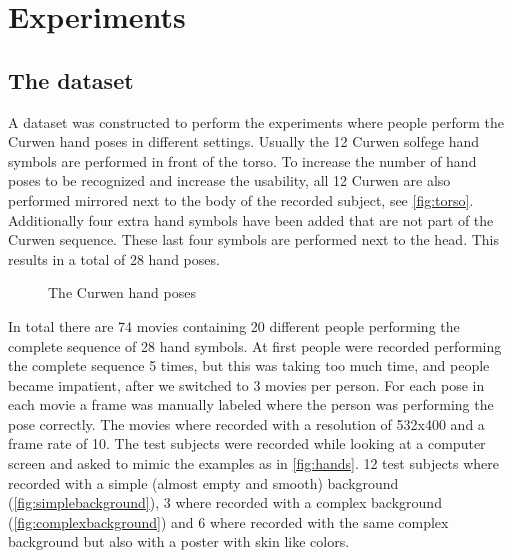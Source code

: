
\chapter{Experiments}
\label{ch:experiments}


\section{The dataset}
A dataset was constructed to perform the experiments where people perform the Curwen hand poses in different settings. Usually the 12 Curwen solfege hand symbols are performed in front of the torso. To increase the number of hand poses to be recognized and increase the usability, all 12 Curwen are also performed mirrored next to the body of the recorded subject, see \autoref{fig:torso}. Additionally four extra hand symbols have been added that are not part of the Curwen sequence. These last four symbols are performed next to the head. This results in a total of 28 hand poses.

\begin{figure}[htbp]
  \centering
\hspace{0.03\linewidth}
  \caption{The Curwen hand poses}
  \label{fig:torso}
\end{figure}


In total there are 74 movies containing 20 different people performing the complete sequence of 28 hand symbols. At first people were recorded performing the complete sequence 5 times, but this was taking too much time, and people became impatient, after we switched to 3 movies per person. For each pose in each movie a frame was manually labeled where the person was performing the pose correctly.  The movies where recorded with  a resolution of 532x400 and a frame rate of 10. The test subjects were recorded while looking at a computer screen and asked to mimic the examples as in \autoref{fig:hands}. 12 test subjects where recorded with a simple (almost empty and smooth) background (\autoref{fig:simplebackground}), 3 where recorded with a complex background (\autoref{fig:complexbackground}) and 6 where recorded with the same complex background but also with a poster with skin like colors.

